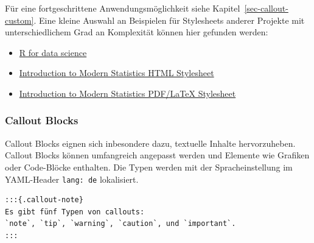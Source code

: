 \documentclass[
  letterpaper,
  DIV=11]{scrartcl}
\begin{document}
Für eine fortgeschrittene Anwendungsmöglichkeit siehe
Kapitel~\ref{sec-callout-custom}. Eine kleine Auswahl an Beispielen für
Stylesheets anderer Projekte mit unterschiedlichem Grad an Komplexität
können hier gefunden werden:

\begin{itemize}
\item
  \href{https://github.com/hadley/r4ds/blob/main/r4ds.scss}{R for data
  science}
\item
  \href{https://github.com/OpenIntroStat/ims/blob/main/scss/ims-style.scss}{Introduction
  to Modern Statistics HTML Stylesheet}
\item
  \href{https://github.com/OpenIntroStat/ims/blob/main/latex/ims-style.tex}{Introduction
  to Modern Statistics PDF/LaTeX Stylesheet}
\end{itemize}

\subsubsection{Callout Blocks}\label{callout-blocks}

Callout Blocks eignen sich inbesondere dazu, textuelle Inhalte
hervorzuheben. Callout Blocks können umfangreich angepasst werden und
Elemente wie Grafiken oder Code-Blöcke enthalten. Die Typen werden mit
der Spracheinstellung im YAML-Header \texttt{lang:\ de} lokalisiert.

\begin{verbatim}
:::{.callout-note}
Es gibt fünf Typen von callouts: 
`note`, `tip`, `warning`, `caution`, und `important`.
:::
\end{verbatim}
\end{document}
